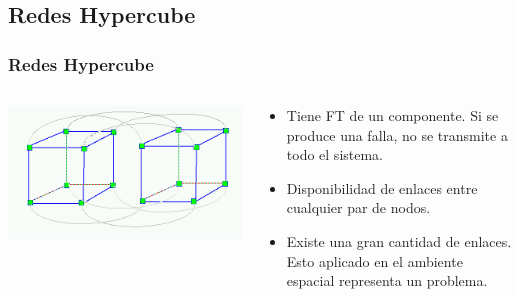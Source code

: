 \subsection{Redes Hypercube}
\begin{frame}
	\frametitle{Redes Hypercube}
	\begin{columns}[T]
		\begin{column}{.5\textwidth}
			\includegraphics[scale=0.3]{images/cube.png}
		\end{column}
		\begin{column}{.5\textwidth}
			\begin{itemize}
				\item Tiene FT  de un componente. Si se produce una falla, no se transmite a todo el sistema. 
				\item Disponibilidad de enlaces entre cualquier par de nodos. 
				\item Existe una gran cantidad de enlaces. Esto aplicado en el ambiente espacial representa un problema. 
				
			\end{itemize}
		\end{column}
	\end{columns}
\end{frame}

